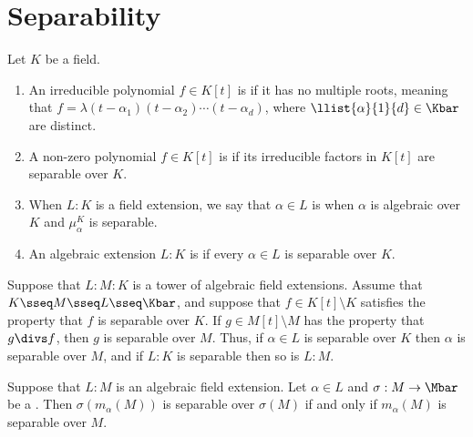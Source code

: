 \documentclass[a4paper]{article}
\begin{document}
\section{Separability}
\begin{tdefinition}[Separable]
  Let \( K \) be a field. \begin{enumerate}[label=(\roman*)]
    \item An irreducible polynomial \( f\in K[t] \) is  if it has no multiple roots, meaning that \( f=\lambda(t-\alpha_1)(t-\alpha_2)\cdots(t-\alpha_d) \), where \( \llist{\alpha}{1}{d}\in \Kbar \) are distinct.
    \item A non-zero polynomial \( f\in K[t] \) is  if its irreducible factors in \( K[t] \) are separable over \( K \).
    \item When \( L:K \) is a field extension, we say that \( \alpha \in L \) is  when \( \alpha \) is algebraic over \( K \) and \( \mu_\alpha^K \) is separable.
    \item An algebraic extension \( L:K \) is  if every \( \alpha\in L \) is separable over \( K \).
  \end{enumerate}
\end{tdefinition}

\begin{tlemma}
  Suppose that \( L:M:K \) is a tower of algebraic field extensions.
  Assume that \( K\sseq M\sseq L\sseq \Kbar \), and suppose that \( f\in K[t]\setminus K \) satisfies the property that \( f \) is separable over \( K \).
  If \( g\in M[t]\setminus M \) has the property that \( g\divs f \), then \( g \) is separable over \( M \).
  Thus, if \( \alpha\in L \) is separable over \( K \) then \( \alpha \) is separable over \( M \), and if \( L:K \) is separable then so is \( L:M \).
\end{tlemma}

\begin{tlemma}
Suppose that \( L:M \) is an algebraic field extension.
  Let \( \alpha\in L \) and \( \sigma:M\to\Mbar \) be a \homo.
  Then \( \sigma(m_\alpha(M)) \) is separable over \( \sigma(M) \) if and only if \( m_\alpha(M) \) is separable over \( M \).
\end{tlemma}
\end{document}
